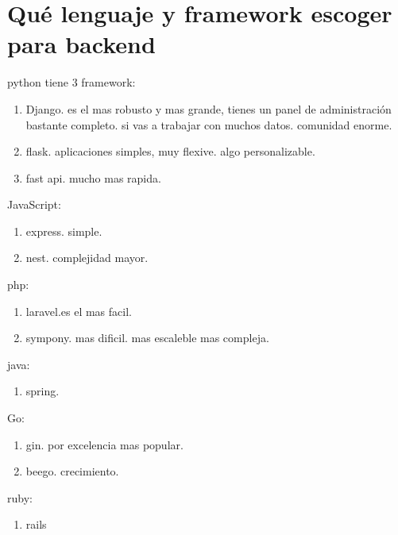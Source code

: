 \documentclass{article}
\begin{document}
    \section{Qué lenguaje y framework escoger para backend}
    python tiene 3 framework:
    \begin{enumerate}
        \item Django. es el mas robusto y mas grande, tienes un panel de administración bastante completo.
        si vas a trabajar con muchos datos. comunidad enorme. 
        \item flask. aplicaciones simples, muy flexive. algo personalizable.
        \item fast api. mucho mas rapida. 
    \end{enumerate}
    JavaScript:
    \begin{enumerate}
        \item express. simple.
        \item nest. complejidad mayor. 
    \end{enumerate}
    php:
    \begin{enumerate}
        \item laravel.es el mas facil. 
        \item sympony. mas dificil. mas escaleble mas compleja.
    \end{enumerate}
    java:
    \begin{enumerate}
        \item spring. 
    \end{enumerate}
    Go:
    \begin{enumerate}
        \item gin. por excelencia mas popular.
        \item beego. crecimiento.
    \end{enumerate}
    ruby:
    \begin{enumerate}
        \item rails
    \end{enumerate}
\end{document}
